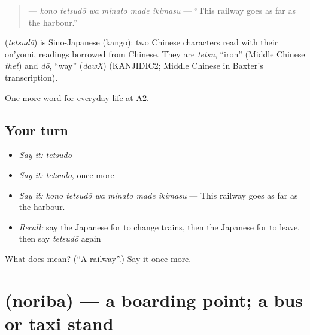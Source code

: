 \begin{quote}
\textbf{   } — \emph{kono tetsudō wa minato made ikimasu} — \textquotedblleft{}This railway goes as far as the harbour.\textquotedblright{}
\end{quote}

\begin{cousinweb}
\textbf{} (\emph{tetsudō}) is Sino-Japanese (kango): two Chinese characters read with their on'yomi, readings borrowed from Chinese. They are \emph{tetsu}, \textquotedblleft{}iron\textquotedblright{} (Middle Chinese \emph{thet}) and \emph{dō}, \textquotedblleft{}way\textquotedblright{} (\emph{dawX}) (KANJIDIC2; Middle Chinese in Baxter's transcription).
\end{cousinweb}

\begin{grammarlens}[title={What you've built}]
One more word for everyday life at A2.
\end{grammarlens}

\subsection*{Your turn}
\begin{itemize}
\raggedright
  \item \emph{Say it:} \emph{tetsudō}
  \item \emph{Say it:} \emph{tetsudō}, once more
  \item \emph{Say it:} \emph{kono tetsudō wa minato made ikimasu} — This railway goes as far as the harbour.
  \item \emph{Recall:} say the Japanese for to change trains, then the Japanese for to leave, then say \emph{tetsudō} again
\end{itemize}

\begin{tcolorbox}[breakable,colback=teal!4,colframe=teal!35!black,title={Before you move on}]
What does  mean? (\textquotedblleft{}A railway\textquotedblright{}.) Say it once more.
\end{tcolorbox}
\section[\texorpdfstring{\ja{のりば} (noriba)}{のりば (noriba)}]{ (noriba) — a boarding point; a bus or taxi stand}

\label{lesson:JA-C200-noriba}



